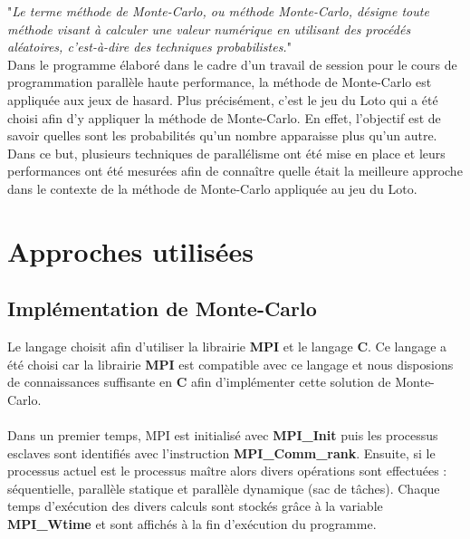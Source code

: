 \documentclass[a4paper,12pt]{article}
\begin{document}
"\textit{Le terme méthode de Monte-Carlo, ou méthode Monte-Carlo, désigne toute méthode visant à calculer une valeur numérique en utilisant des procédés aléatoires, c'est-à-dire des techniques probabilistes.}" \cite{wiki:montecarlo}
\\
Dans le programme élaboré dans le cadre d'un travail de session pour le cours de programmation parallèle haute performance, la méthode de Monte-Carlo est appliquée aux jeux de hasard.
Plus précisément, c'est le jeu du Loto qui a été choisi afin d'y appliquer la méthode de Monte-Carlo. En effet, l'objectif est de savoir quelles sont les probabilités qu'un nombre apparaisse plus qu'un autre. Dans ce but, plusieurs techniques de parallélisme ont été mise en place et leurs performances ont été mesurées afin de connaître quelle était la meilleure approche dans le contexte de la méthode de Monte-Carlo appliquée au jeu du Loto. 


\section{Approches utilisées}

\subsection{Implémentation de Monte-Carlo}
Le langage choisit afin d'utiliser la librairie \textbf{MPI} et le langage \textbf{C}. Ce langage a été choisi car la librairie \textbf{MPI} est compatible avec ce langage et nous disposions de connaissances suffisante en \textbf{C} afin d'implémenter cette solution de Monte-Carlo. 
\\\\Dans un premier temps, MPI est initialisé avec \textbf{MPI\_Init} puis les processus esclaves sont identifiés avec l'instruction \textbf{MPI\_Comm\_rank}. Ensuite, si le processus actuel est le processus maître alors divers opérations sont effectuées : séquentielle, parallèle statique et parallèle dynamique (sac de tâches). Chaque temps d'exécution des divers calculs sont stockés grâce à la variable \textbf{MPI\_Wtime} et sont affichés à la fin d'exécution du programme.
\end{document}
